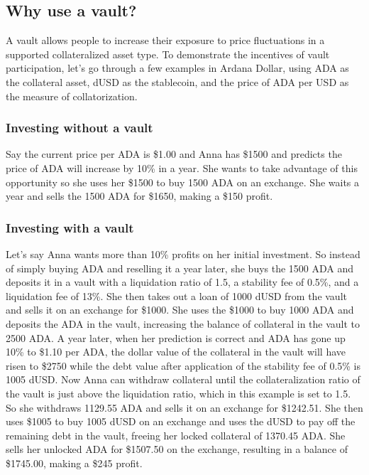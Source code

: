 \documentclass[12pt]{article}
\begin{document}
\subsection{Why use a vault?}

A vault allows people to increase their exposure to price fluctuations in a supported collateralized asset type. To demonstrate the incentives of vault participation, let's go through a few examples in Ardana Dollar, using ADA as the collateral asset, dUSD as the stablecoin, and the price of ADA per USD as the measure of collatorization.

	\subsubsection{Investing without a vault}

Say the current price per ADA is \$1.00 and Anna has \$1500 and predicts the price of ADA will increase by 10\% in a year. She wants to take advantage of this opportunity so she uses her \$1500 to buy 1500 ADA on an exchange. She waits a year and sells the 1500 ADA for \$1650, making a \$150 profit.

	\subsubsection{Investing with a vault}

Let's say Anna wants more than 10\% profits on her initial investment. So instead of simply buying ADA and reselling it a year later, she buys the 1500 ADA and deposits it in a vault with a liquidation ratio of 1.5, a stability fee of 0.5\%, and a liquidation fee of 13\%. She then takes out a loan of 1000 dUSD from the vault and sells it on an exchange for \$1000. She uses the \$1000 to buy 1000 ADA and deposits the ADA in the vault, increasing the balance of collateral in the vault to 2500 ADA. A year later, when her prediction is correct and ADA has gone up 10\% to \$1.10 per ADA, the dollar value of the collateral in the vault will have risen to \$2750 while the debt value after application of the stability fee of 0.5\% is 1005 dUSD. Now Anna can withdraw collateral until the collateralization ratio of the vault is just above the liquidation ratio, which in this example is set to 1.5. So she withdraws 1129.55 ADA and sells it on an exchange for \$1242.51. She then uses \$1005 to buy 1005 dUSD on an exchange and uses the dUSD to pay off the remaining debt in the vault, freeing her locked collateral of 1370.45 ADA. She sells her unlocked ADA for \$1507.50 on the exchange, resulting in a balance of \$1745.00, making a \$245 profit.
\end{document}
